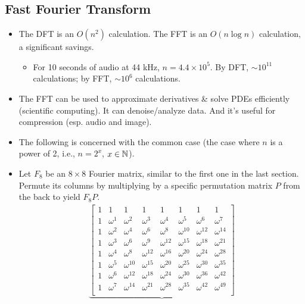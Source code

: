 \documentclass{article}
\begin{document}
\subsection*{Fast Fourier Transform}
\begin{itemize}
    \item {} The DFT is an $O(n^2)$ calculation. The FFT is an $O(n\log n)$ calculation, a significant savings.
    \begin{itemize}
        \item For 10 seconds of audio at 44 kHz, $n=4.4\times 10^5$. By DFT, $\sim 10^{11}$ calculations; by FFT, $\sim 10^6$ calculations.
    \end{itemize}
    \item The FFT can be used to approximate derivatives \& solve PDEs efficiently (scientific computing). It can denoise/analyze data. And it's useful for compression (esp. audio and image).
    \item The following is concerned with the common case (the case where $n$ is a power of 2, i.e., $n=2^x$, $x\in\mathbb{N}$).
    \item Let $F_8$ be an $8\times 8$ Fourier matrix, similar to the first one in the last section. Permute its columns by multiplying by a specific permutation matrix $P$ from the back to yield $F_8P$.
    \begin{multline*}
        \underbrace{
            \begin{bmatrix}
                1 & 1 & 1 & 1 & 1 & 1 & 1 & 1\\
                1 & \omega^1 & \omega^2    & \omega^3    & \omega^4    & \omega^5    & \omega^6    & \omega^7   \\
                1 & \omega^2 & \omega^4    & \omega^6    & \omega^8    & \omega^{10} & \omega^{12} & \omega^{14}\\
                1 & \omega^3 & \omega^6    & \omega^9    & \omega^{12} & \omega^{15} & \omega^{18} & \omega^{21}\\
                1 & \omega^4 & \omega^8    & \omega^{12} & \omega^{16} & \omega^{20} & \omega^{24} & \omega^{28}\\
                1 & \omega^5 & \omega^{10} & \omega^{15} & \omega^{20} & \omega^{25} & \omega^{30} & \omega^{35}\\
                1 & \omega^6 & \omega^{12} & \omega^{18} & \omega^{24} & \omega^{30} & \omega^{36} & \omega^{42}\\
                1 & \omega^7 & \omega^{14} & \omega^{21} & \omega^{28} & \omega^{35} & \omega^{42} & \omega^{49}\\

\end{bmatrix}}
\end{multline*}
\end{itemize}
\end{document}
